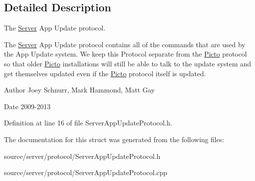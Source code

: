 \subsection{Detailed Description}
The \hyperlink{class_server}{Server} App Update protocol. 

The \hyperlink{class_server}{Server} App Update protocol contains all of the commands that are used by the App Update system. We keep this Protocol separate from the \hyperlink{namespace_picto}{Picto} protocol so that older \hyperlink{namespace_picto}{Picto} installations will still be able to talk to the update system and get themselves updated even if the \hyperlink{namespace_picto}{Picto} protocol itself is updated. \begin{DoxyAuthor}{Author}
Joey Schnurr, Mark Hammond, Matt Gay 
\end{DoxyAuthor}
\begin{DoxyDate}{Date}
2009-\/2013 
\end{DoxyDate}


Definition at line 16 of file Server\-App\-Update\-Protocol.\-h.



The documentation for this struct was generated from the following files\-:\begin{DoxyCompactItemize}
\item 
source/server/protocol/Server\-App\-Update\-Protocol.\-h\item 
source/server/protocol/Server\-App\-Update\-Protocol.\-cpp\end{DoxyCompactItemize}
